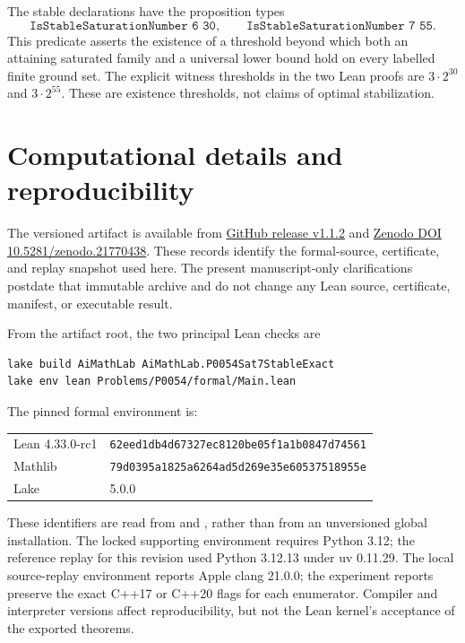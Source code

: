 \documentclass[11pt,a4paper]{article}
\theoremstyle{definition}
\newcommand{\code}[1]{\texttt{#1}}
\begin{document}
The stable declarations have the proposition types
\[
 \code{IsStableSaturationNumber 6 30},\qquad
 \code{IsStableSaturationNumber 7 55}.
\]
This predicate asserts the existence of a threshold beyond which both an
attaining saturated family and a universal lower bound hold on every
labelled finite ground set.  The explicit witness thresholds in the two Lean
proofs are $3\cdot2^{30}$ and $3\cdot2^{55}$.  These are existence thresholds,
not claims of optimal stabilization.

\section{Computational details and reproducibility}
\label{sec:reproduction}

The versioned artifact is available from
\href{https://github.com/lailai0916/saturated-sperner-6-7/releases/tag/v1.1.2}
{GitHub release v1.1.2} and
\href{https://doi.org/10.5281/zenodo.21770438}{Zenodo DOI
10.5281/zenodo.21770438}.  These records identify the formal-source,
certificate, and replay snapshot used here.  The present manuscript-only
clarifications postdate that immutable archive and do not change any Lean
source, certificate, manifest, or executable result.

From the artifact root, the two principal Lean checks are
\begin{verbatim}
lake build AiMathLab AiMathLab.P0054Sat7StableExact
lake env lean Problems/P0054/formal/Main.lean
\end{verbatim}
The pinned formal environment is:
\begin{center}
\small
\begin{tabular}{@{}ll@{}}
Lean 4.33.0-rc1 & \texttt{62eed1db4d67327ec8120be05f1a1b0847d74561}\\
Mathlib & \texttt{79d0395a1825a6264ad5d269e35e60537518955e}\\
Lake & 5.0.0
\end{tabular}
\end{center}
These identifiers are read from  and
, rather than from an unversioned global
installation.  The locked supporting environment
requires Python 3.12; the reference replay for this revision used Python
3.12.13 under uv 0.11.29.  The local source-replay environment reports Apple
clang 21.0.0; the experiment reports preserve the exact C++17 or C++20 flags
for each enumerator.  Compiler and interpreter versions affect
reproducibility, but not the Lean kernel's acceptance of the exported
theorems.
\end{document}

